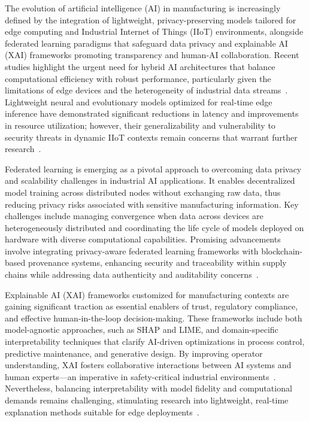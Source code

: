 \documentclass[sigconf]{acmart}
\begin{document}
The evolution of artificial intelligence (AI) in manufacturing is increasingly defined by the integration of lightweight, privacy-preserving models tailored for edge computing and Industrial Internet of Things (IIoT) environments, alongside federated learning paradigms that safeguard data privacy and explainable AI (XAI) frameworks promoting transparency and human-AI collaboration. Recent studies highlight the urgent need for hybrid AI architectures that balance computational efficiency with robust performance, particularly given the limitations of edge devices and the heterogeneity of industrial data streams~\cite{ref5,ref30}. Lightweight neural and evolutionary models optimized for real-time edge inference have demonstrated significant reductions in latency and improvements in resource utilization; however, their generalizability and vulnerability to security threats in dynamic IIoT contexts remain concerns that warrant further research~\cite{ref31}.

Federated learning is emerging as a pivotal approach to overcoming data privacy and scalability challenges in industrial AI applications. It enables decentralized model training across distributed nodes without exchanging raw data, thus reducing privacy risks associated with sensitive manufacturing information. Key challenges include managing convergence when data across devices are heterogeneously distributed and coordinating the life cycle of models deployed on hardware with diverse computational capabilities. Promising advancements involve integrating privacy-aware federated learning frameworks with blockchain-based provenance systems, enhancing security and traceability within supply chains while addressing data authenticity and auditability concerns~\cite{ref6,ref25,ref41}.

Explainable AI (XAI) frameworks customized for manufacturing contexts are gaining significant traction as essential enablers of trust, regulatory compliance, and effective human-in-the-loop decision-making. These frameworks include both model-agnostic approaches, such as SHAP and LIME, and domain-specific interpretability techniques that clarify AI-driven optimizations in process control, predictive maintenance, and generative design. By improving operator understanding, XAI fosters collaborative interactions between AI systems and human experts—an imperative in safety-critical industrial environments~\cite{ref35,ref44}. Nevertheless, balancing interpretability with model fidelity and computational demands remains challenging, stimulating research into lightweight, real-time explanation methods suitable for edge deployments~\cite{ref38}.
\end{document}
